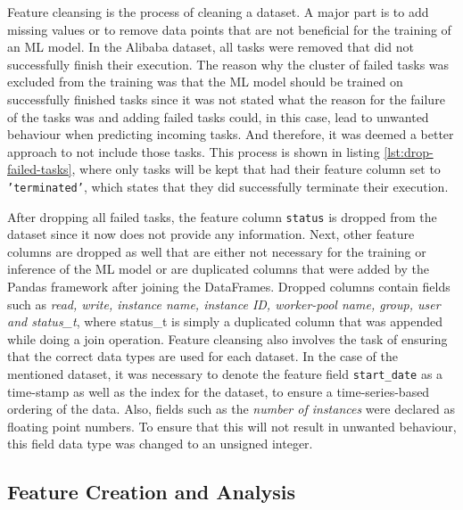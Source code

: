     Feature cleansing is the process of cleaning a dataset. 
    A major part is to add missing values or to remove data points that are not beneficial for the training of an ML model. 
    In the Alibaba dataset, all tasks were removed that did not successfully finish their execution. The reason why the cluster of failed tasks was excluded from the training was that the ML model should be trained on successfully finished tasks since it was not stated what the reason for the failure of the tasks was and adding failed tasks could, in this case, lead to unwanted behaviour when predicting incoming tasks. And therefore, it was deemed a better approach to not include those tasks. 
    This process is shown in listing \ref{lst:drop-failed-tasks}, where only tasks will be kept that had their feature column set to \texttt{'terminated'}, which states that they did successfully terminate their execution.
    
    After dropping all failed tasks, the feature column \texttt{status} is dropped from the dataset since it now does not provide any information.
    Next, other feature columns are dropped as well that are either not necessary for the training or inference of the ML model or are duplicated columns that were added by the Pandas framework after joining the DataFrames. Dropped columns contain fields such as \emph{read, write, instance name, instance ID, worker-pool name, group, user and status\_t}, where status\_t is simply a duplicated column that was appended while doing a join operation. Feature cleansing also involves the task of ensuring that the correct data types are used for each dataset. In the case of the mentioned dataset, it was necessary to denote the feature field \texttt{start\_date} as a time-stamp as well as the index for the dataset, to ensure a time-series-based ordering of the data. Also, fields such as the \emph{number of instances} were declared as floating point numbers. To ensure that this will not result in unwanted behaviour, this field data type was changed to an unsigned integer.

  \subsection{Feature Creation and Analysis}
  \label{sec:feature-creation-analysis-preprocessing-architecture}

